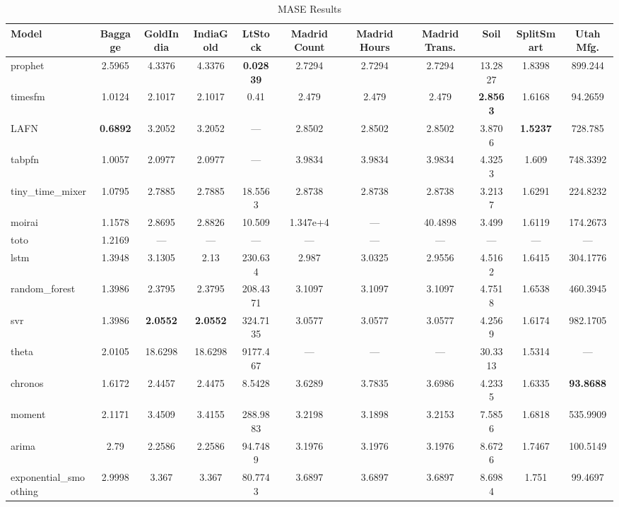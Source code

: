 \begin{table}
\centering
\caption{MASE Results}
\label{tab:mase}
\begin{adjustbox}{width=0.95\textheight,center}
\small
\begin{tabular}{lcccccccccc}
\toprule
Model & Baggage & GoldIndia & IndiaGold & LtStock & Madrid Count & Madrid Hours & Madrid Trans. & Soil & SplitSmart & Utah Mfg. \\
\midrule
prophet & 2.5965 & 4.3376 & 4.3376 & \textbf{0.02839} & 2.7294 & 2.7294 & 2.7294 & 13.2827 & 1.8398 & 899.244 \\
timesfm & 1.0124 & 2.1017 & 2.1017 & 0.41 & 2.479 & 2.479 & 2.479 & \textbf{2.8563} & 1.6168 & 94.2659 \\
LAFN & \textbf{0.6892} & 3.2052 & 3.2052 & --- & 2.8502 & 2.8502 & 2.8502 & 3.8706 & \textbf{1.5237} & 728.785 \\
tabpfn & 1.0057 & 2.0977 & 2.0977 & --- & 3.9834 & 3.9834 & 3.9834 & 4.3253 & 1.609 & 748.3392 \\
tiny\_time\_mixer & 1.0795 & 2.7885 & 2.7885 & 18.5563 & 2.8738 & 2.8738 & 2.8738 & 3.2137 & 1.6291 & 224.8232 \\
moirai & 1.1578 & 2.8695 & 2.8826 & 10.509 & 1.347e+4 & --- & 40.4898 & 3.499 & 1.6119 & 174.2673 \\
toto & 1.2169 & --- & --- & --- & --- & --- & --- & --- & --- & --- \\
lstm & 1.3948 & 3.1305 & 2.13 & 230.634 & 2.987 & 3.0325 & 2.9556 & 4.5162 & 1.6415 & 304.1776 \\
random\_forest & 1.3986 & 2.3795 & 2.3795 & 208.4371 & 3.1097 & 3.1097 & 3.1097 & 4.7518 & 1.6538 & 460.3945 \\
svr & 1.3986 & \textbf{2.0552} & \textbf{2.0552} & 324.7135 & 3.0577 & 3.0577 & 3.0577 & 4.2569 & 1.6174 & 982.1705 \\
theta & 2.0105 & 18.6298 & 18.6298 & 9177.467 & --- & --- & --- & 30.3313 & 1.5314 & --- \\
chronos & 1.6172 & 2.4457 & 2.4475 & 8.5428 & 3.6289 & 3.7835 & 3.6986 & 4.2335 & 1.6335 & \textbf{93.8688} \\
moment & 2.1171 & 3.4509 & 3.4155 & 288.9883 & 3.2198 & 3.1898 & 3.2153 & 7.5856 & 1.6818 & 535.9909 \\
arima & 2.79 & 2.2586 & 2.2586 & 94.7489 & 3.1976 & 3.1976 & 3.1976 & 8.6726 & 1.7467 & 100.5149 \\
exponential\_smoothing & 2.9998 & 3.367 & 3.367 & 80.7743 & 3.6897 & 3.6897 & 3.6897 & 8.6984 & 1.751 & 99.4697 \\

\end{tabular}
\end{adjustbox}
\end{table}
